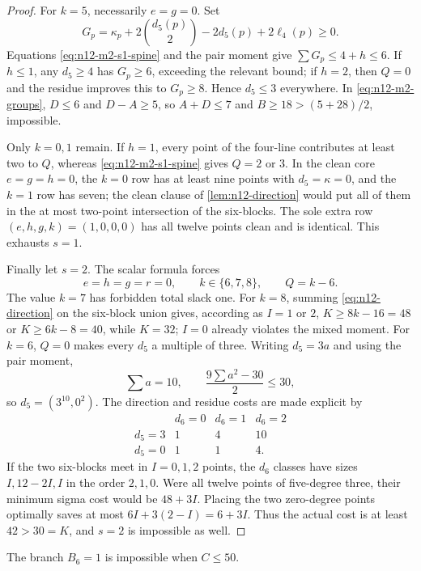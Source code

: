 \begin{proof}
For $k=5$, necessarily $e=g=0$.  Set
\[
G_p=\kappa_p+2\binom{d_5(p)}2-2d_5(p)+2\ell_4(p)\ge0.
\]
Equations \eqref{eq:n12-m2-s1-spine} and the pair moment give
$\sum G_p\le4+h\le6$.  If $h\le1$, any $d_5\ge4$ has $G_p\ge6$, exceeding
the relevant bound; if $h=2$, then $Q=0$ and the residue improves this to
$G_p\ge8$.  Hence $d_5\le3$ everywhere.  In
\eqref{eq:n12-m2-groups}, $D\le6$ and $D-A\ge5$, so $A+D\le7$ and
$B\ge18>(5+28)/2$, impossible.

Only $k=0,1$ remain.  If $h=1$, every point of the four-line contributes
at least two to $Q$, whereas \eqref{eq:n12-m2-s1-spine} gives $Q=2$ or
$3$.  In the clean core $e=g=h=0$, the $k=0$ row has at least nine points
with $d_5=\kappa=0$, and the $k=1$ row has seven; the clean clause of
\cref{lem:n12-direction} would put all of them in the at most two-point
intersection of the six-blocks.  The sole extra row
$(e,h,g,k)=(1,0,0,0)$ has all twelve points clean and is identical.
This exhausts $s=1$.

Finally let $s=2$.  The scalar formula forces
\[
e=h=g=r=0,\qquad k\in\{6,7,8\},\qquad Q=k-6.
\]
The value $k=7$ has forbidden total slack one.  For $k=8$, summing
\eqref{eq:n12-direction} on the six-block union gives, according as
$I=1$ or $2$, $K\ge8k-16=48$ or $K\ge6k-8=40$, while $K=32$;
$I=0$ already violates the mixed moment.  For $k=6$, $Q=0$ makes every
$d_5$ a multiple of three.  Writing $d_5=3a$ and using the pair moment,
\[
 \sum a=10,\qquad
 \frac{9\sum a^2-30}{2}\le30,
\]
so $d_5=(3^{10},0^2)$.  The direction and residue costs are made explicit
by
\[
\begin{array}{c|ccc}
&d_6=0&d_6=1&d_6=2\\ \hline
d_5=3&1&4&10\\
d_5=0&1&1&4.
\end{array}
\]
If the two six-blocks meet in $I=0,1,2$ points, the $d_6$ classes have
sizes $I,12-2I,I$ in the order $2,1,0$.  Were all twelve points of
five-degree three, their minimum sigma cost would be $48+3I$.  Placing the
two zero-degree points optimally saves at most
$6I+3(2-I)=6+3I$.  Thus the actual cost is at least $42>30=K$, and
$s=2$ is impossible as well.
\end{proof}

\begin{lemma}\label{lem:n12-g6-m1}
The branch $B_6=1$ is impossible when $C\le50$.
\end{lemma}

